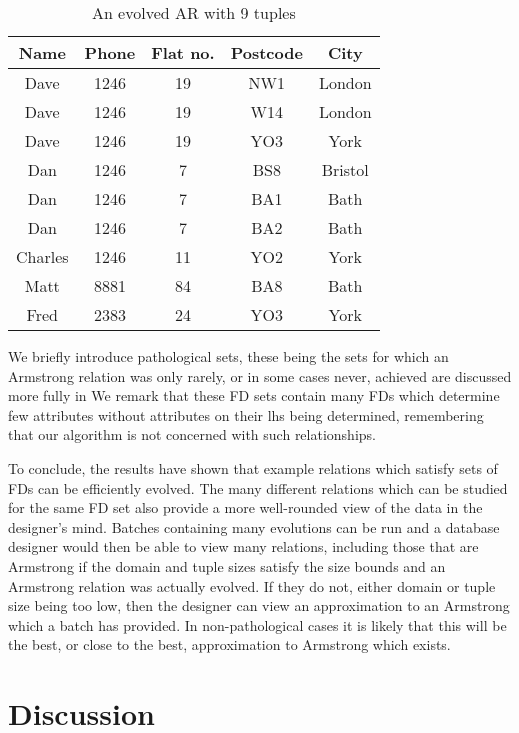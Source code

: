 {\line
\begin{table}
\begin{center}
\begin{tabular}{|c|c|c|c|c|} \hline 
{ \bf Name} & { \bf Phone} & {\bf Flat no. }  & { \bf Postcode}  & {\bf City} \\ \hline
Dave & 1246 & 19 & NW1 & London  \\
Dave & 1246 & 19 & W14 & London \\
Dave & 1246 & 19 & YO3 & York \\
Dan & 1246 & 7 & BS8 & Bristol \\
Dan & 1246 & 7 & BA1 & Bath \\
Dan & 1246 & 7 & BA2 & Bath \\
Charles & 1246 & 11 & YO2 & York \\
Matt & 8881 & 84 & BA8 & Bath \\
Fred & 2383 & 24 & YO3 & York \\ \hline
\end{tabular}
\end{center}
\caption{\label{table:5.34} An evolved AR with 9 tuples }
\end{table}
}

\medskip
{}
We briefly introduce pathological sets, these being
the sets for which an Armstrong relation was only rarely,
or in some cases never, achieved are discussed more fully in \cite{cl96}
We remark that these FD sets contain many FDs which determine
few attributes without attributes on their lhs being determined,
remembering that 
our algorithm is not concerned with such relationships.

\medskip
To conclude, the results have shown that example relations which satisfy sets
of FDs can be efficiently evolved. The many different
relations which can be studied for the same FD set also provide a
more well-rounded view of the data in the designer's mind.
Batches containing
many evolutions can be run and a database designer would then be able
to view many relations, including those that are Armstrong if the domain
and tuple sizes satisfy the size bounds and an Armstrong relation
was actually evolved.  If they do not, either domain
or tuple size being too low, then the designer can view an
approximation to an Armstrong which a batch has provided. In
non-pathological cases it is likely that
this will be the best, or close to the best, approximation to Armstrong
which exists.

\section{Discussion}\label{sec:nd_disc}

